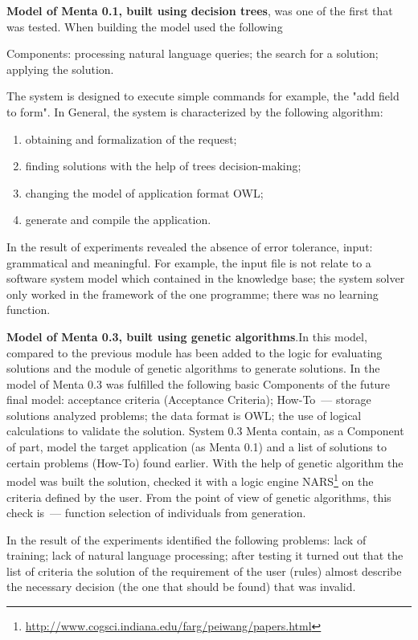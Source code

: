 \textbf{Model of Menta 0.1, built using decision trees}, was one of the first that was tested. When building the model used the following 

Components: processing natural language queries; the search for a solution; applying the solution. \par
The system is designed to execute simple commands for example, the "add field to form". In General, the system is characterized by the following algorithm:
\begin{enumerate}
	\item obtaining and formalization of the request;
	\item finding solutions with the help of trees decision-making;
	\item changing the model of application format OWL;
	\item generate and compile the application.
\end{enumerate} \par
In the result of experiments revealed the absence of error tolerance, input: grammatical and meaningful. For example, the input file is not relate to a software system model which contained in the knowledge base; the system solver only worked in the framework of the one programme; there was no learning function. \par

\textbf{Model of Menta 0.3, built using genetic algorithms}.In this model, compared to 
the previous module has been added to the logic for evaluating solutions and the module of genetic algorithms to generate solutions. In the model of Menta 0.3 was fulfilled the following basic Components of the future final model: acceptance criteria (Acceptance Criteria); How-To~--- storage solutions analyzed problems; the data format is OWL; the use of logical calculations to validate the solution. System 0.3 Menta contain, as a Component of part, model the target application (as Menta 0.1) and a list of solutions to certain problems (How-To) found earlier. With the help of genetic algorithm the model was built the solution, checked it with a logic engine NARS\footnote{\url{http://www.cogsci.indiana.edu/farg/peiwang/papers.html}} on the criteria defined by the user. From the point of view of genetic algorithms, this check is~--- function selection of individuals from generation.  \par
In the result of the experiments identified the following problems: lack of training; lack of natural language processing; after testing it turned out that the list of criteria the solution of the requirement of the user (rules) almost describe the necessary decision (the one that should be found) that was invalid. \par


